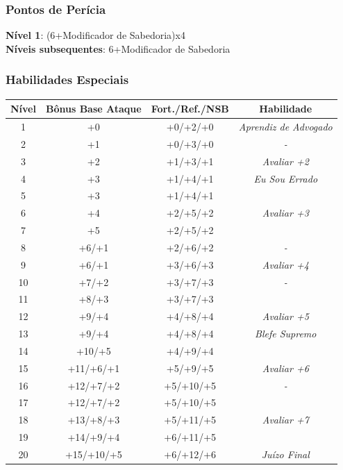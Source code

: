 \documentclass[ letterpaper,12pt]{article}
\begin{document}
\subsubsection{Pontos de Perícia}
{\bf Nível 1}: (6+Modificador de Sabedoria)x4\\
{\bf Níveis subsequentes}: 6+Modificador de Sabedoria\\

\subsubsection{Habilidades Especiais}

\begin{center} \begin{tabular}{|c||c|c|c|}
\hline
{\bf Nível}&{\bf Bônus Base Ataque}&{\bf Fort./Ref./NSB}&{\bf Habilidade}\\
\hline
1&+0&+0/+2/+0&{\it Aprendiz de Advogado}\\
\hline
2&+1&+0/+3/+0&{\it - }\\
\hline
3&+2&+1/+3/+1&{\it Avaliar +2}\\
\hline
4&+3&+1/+4/+1&{\it Eu Sou Errado}\\
\hline
5&+3&+1/+4/+1&{\it }\\
\hline
6&+4&+2/+5/+2&{\it Avaliar +3}\\
\hline
7&+5&+2/+5/+2&{\it }\\
\hline
8&+6/+1&+2/+6/+2&{\it - }\\
\hline
9 & +6/+1& +3/+6/+3 & {\it Avaliar +4}\\
\hline
10 & +7/+2 & +3/+7/+3 & {\it -}\\
\hline
11 & +8/+3 & +3/+7/+3 & {\it }\\
\hline
12 & +9/+4 & +4/+8/+4 & {\it Avaliar +5}\\
\hline
13 & +9/+4 & +4/+8/+4 & {\it Blefe Supremo}\\
\hline
14 & +10/+5 & +4/+9/+4 & {\it }\\
\hline
15 & +11/+6/+1 & +5/+9/+5 & {\it Avaliar +6}\\
\hline
16 & +12/+7/+2 & +5/+10/+5 & {\it -}\\
\hline
17 & +12/+7/+2 & +5/+10/+5 & {\it }\\
\hline
18 & +13/+8/+3 & +5/+11/+5 & {\it Avaliar +7}\\
\hline
19 & +14/+9/+4 & +6/+11/+5 & {\it }\\
\hline
20 & +15/+10/+5 & +6/+12/+6 & {\it Juízo Final}\\
\hline
\end{tabular} \end{center}
\end{document}
